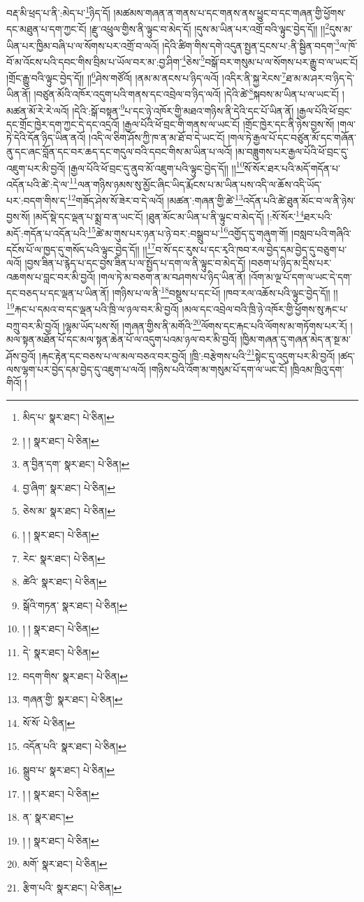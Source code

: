 བརྡ་མི་ཕྲད་པ་ནི་:མེད་པ་\footnote{མིད་པ་  སྣར་ཐང་།  པེ་ཅིན། }ཉིད་དོ། །མཚམས་གཞན་ན་གནས་པ་དང་གནས་ནས་ཕྱུང་བ་དང་གཞན་གྱི་ཕྱོགས་དང་མཐུན་པ་དག་ཀྱང་ངོ། །རྫུ་འཕྲུལ་གྱིས་ནི་ལྟུང་བ་མེད་དོ། །དུས་མ་ཡིན་པར་འགྲོ་བའི་ལྟུང་བྱེད་དོ།། །།\footnote{། །  སྣར་ཐང་།  པེ་ཅིན། }དུས་མ་ཡིན་པར་ཁྱིམ་བཞི་པ་ལ་སོགས་པར་འགྲོ་བ་ལའོ། །དེའི་ཚིག་གིས་དགེ་འདུན་སྤྱན་དྲངས་པ་:ནི་སྦྱིན་བདག་\footnote{ན་བྱིན་དག་  སྣར་ཐང་།  པེ་ཅིན། }ལ་ཁོ་བོ་མ་འོངས་པའི་དབང་གིས་བྲིམ་པ་ཡོལ་བར་མ་:བྱ་ཤིག་\footnote{བྱ་ཞིག་  སྣར་ཐང་།  པེ་ཅིན། }ཅེས་\footnote{ཅེས་མ་  སྣར་ཐང་།  པེ་ཅིན། }བསྒོ་བར་གསུམ་པ་ལ་སོགས་པར་རྒྱུ་བ་ལ་ཡང་ངོ། །གྲོང་རྒྱུ་བའི་ལྟུང་བྱེད་དོ།། །།\footnote{། །  སྣར་ཐང་།  པེ་ཅིན། }ཤེས་གཙོའོ། །ནམ་མ་ནངས་པ་ཉིད་ལའོ། །འདིར་ནི་སྐྱ་རེངས་\footnote{རེང་  སྣར་ཐང་།  པེ་ཅིན། }ཐ་མ་མ་ཤར་བ་ཉིད་དེ་ཡིན་ནོ། །བཙུན་མོའི་འཁོར་འདུག་པའི་གནས་དང་འབྲེལ་བ་ཉིད་ལའོ། །དེའི་ཚེ་\footnote{ཚེའི་  སྣར་ཐང་།  པེ་ཅིན། }སྐབས་མ་ཡིན་པ་ལ་ཡང་ངོ། །མཚན་མོ་རེ་རེ་ལའོ། །དེའི་:སྒོ་བསྟན་\footnote{སྒོའི་གཏན་  སྣར་ཐང་།  པེ་ཅིན། }པ་དང་ཉེ་འཁོར་གྱི་མཐའ་གཉིས་ནི་དེའི་དང་པོ་ཡིན་ནོ། །རྒྱལ་པོའི་ཕོ་བྲང་དང་གྲོང་ཁྱེར་དག་ཀྱང་དེ་དང་འདྲའོ། །རྒྱལ་པོའི་ཕོ་བྲང་གི་གནས་ལ་ཡང་ངོ། །གྲོང་ཁྱེར་དང་ནི་ཉེས་བྱས་སོ། །གལ་ཏེ་དེའི་དོན་ཉིད་ཡིན་ནའོ། །འདི་ལ་ཅིག་ཤོས་ཀྱི་ཁ་ན་མ་ཐོ་བ་དེ་ཡང་ངོ། །གལ་ཏེ་རྒྱལ་པོ་དང་བཙུན་མོ་དང་གཞོན་ནུ་དང་ཞང་བློན་དང་བར་ཆད་དང་གདུལ་བའི་དབང་གིས་མ་ཡིན་པ་ལའོ། །མ་བཟླུགས་པར་རྒྱལ་པོའི་ཕོ་བྲང་དུ་འཇུག་པར་མི་བྱའོ། །རྒྱལ་པོའི་ཕོ་བྲང་དུ་ནུབ་མོ་འཇུག་པའི་ལྟུང་བྱེད་དོ།། །།\footnote{། །  སྣར་ཐང་།  པེ་ཅིན། }སོ་སོར་ཐར་པའི་མདོ་གདོན་པ་འདོན་པའི་ཚེ་:དེ་ལ་\footnote{དེ་  སྣར་ཐང་།  པེ་ཅིན། }ལན་གཉིས་ཉམས་སུ་མྱོང་ཞིང་ཡིད་རྨོངས་པ་མ་ཡིན་པས་འདི་ལ་ཆོས་འདི་ཡོད་པར་:བདག་གིས་ད་\footnote{བདག་གིས་  སྣར་ཐང་།  པེ་ཅིན། }གཟོད་ཤེས་སོ་ཟེར་བ་དེ་ལའོ། །མཚན་:གཞན་གྱི་ཚེ་\footnote{གཞན་གྱི་  སྣར་ཐང་།  པེ་ཅིན། }འདོན་པའི་ཚེ་ཐུན་མོང་བ་ལ་ནི་ཉེས་བྱས་སོ། །མདོ་སྡེ་དང་ལྡན་པ་སྨྲ་བ་ན་ཡང་ངོ། །ཐུན་མོང་མ་ཡིན་པ་ནི་ལྟུང་བ་མེད་དོ། །:སོ་སོར་\footnote{སོ་སོ་  པེ་ཅིན། }ཐར་པའི་མདོ་:གདོན་པ་འདོན་པའི་\footnote{འདོན་པའི་  སྣར་ཐང་།  པེ་ཅིན། }ཚེ་མ་གུས་པར་ཉན་པ་ཉེ་བར་:བསྒྲུབ་པ་\footnote{སྒྲུབ་པ་  སྣར་ཐང་།  པེ་ཅིན། }འགྱོད་དུ་གཞུག་གོ། །བསླབ་པའི་གཞིའི་དངོས་པོ་ལ་ཁྱད་དུ་གསོད་པའི་ལྟུང་བྱེད་དོ།། །།\footnote{། །  སྣར་ཐང་།  པེ་ཅིན། }བ་སོ་དང་རུས་པ་དང་རྭའི་ཁབ་རལ་བྱེད་དམ་བྱེད་དུ་བཅུག་པ་ལའོ། །བྱས་ཟིན་པ་རྙེད་པ་དང་བྱས་ཟིན་པ་ལ་སྤྱོད་པ་དག་ལ་ནི་ལྟུང་བ་མེད་དོ། །བཅག་པ་ཉིད་མ་དྲིས་པར་འཆགས་པ་བླང་བར་མི་བྱའོ། །གལ་ཏེ་མ་བཅག་ན་མ་བཤགས་པ་ཉིད་ཡིན་ནོ། །འོག་མ་ལྔ་པོ་དག་ལ་ཡང་དེ་དག་དང་བཅད་པ་དང་ལྡན་པ་ཡིན་ནོ། །གཉིས་པ་ལ་ནི་\footnote{ན་  སྣར་ཐང་། }བསྡུས་པ་དང་པོ། །ཁབ་རལ་འཆོས་པའི་ལྟུང་བྱེད་དོ།། །།\footnote{། །  སྣར་ཐང་།  པེ་ཅིན། }རྐང་པ་དམའ་བ་དང་ལྡན་པའི་ཁྲི་ལ་ཉལ་བར་མི་བྱའོ། །མལ་དང་འབྲེལ་བའི་ཁྲི་ཉེ་འཁོར་གྱི་ཕྱོགས་སུ་རྐང་པ་བཀྲུ་བར་མི་བྱའོ། །ལྷམ་ཡོད་པས་སོ། །གཞན་གྱིས་ནི་མགོའི་\footnote{མགོ་  སྣར་ཐང་།  པེ་ཅིན། }ལོགས་དང་རྐང་པའི་ལོགས་མ་གཏོགས་པར་རོ། །མལ་སྟན་མཐོན་པོ་དང་མལ་སྟན་ཆེན་པོ་ལ་འདུག་པའམ་ཉལ་བར་མི་བྱའོ། །ཁྱིམ་གཞན་དུ་གཞན་མེད་ན་སྔ་མ་ཤོས་བྱའོ། །རྐང་རྟེན་དང་བཅས་པ་ལ་མལ་བཅའ་བར་བྱའོ། །ཁྲི་:བརྩེགས་པའི་\footnote{རྩིག་པའི་  སྣར་ཐང་།  པེ་ཅིན། }སྟེང་དུ་འདུག་པར་མི་བྱའོ། །ཚད་ལས་ལྷག་པར་བྱེད་དམ་བྱེད་དུ་འཇུག་པ་ལའོ། །གཉིས་པའི་འོག་མ་གསུམ་པོ་དག་ལ་ཡང་ངོ། །ཁྲིའམ་ཁྲིའུ་དག་གིའོ། །
